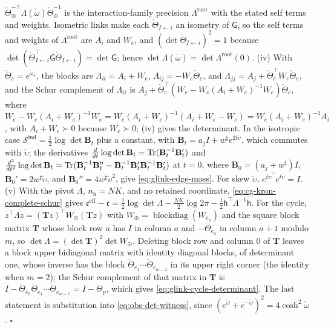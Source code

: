 \(\mathring\Theta_\oplus^{-\top}\Lambda(\mathring\omega)\mathring\Theta_\oplus^{-1}\) is the interaction-family precision
\(\Lambda^{\mathrm{root}}\) with the stated self terms and weights. Isometric links make each
\(\mathring\Theta_{I\leftarrow i}\) an isometry of \(\mathsf G\), so the self terms and weights of \(\Lambda^{\mathrm{root}}\)
are \(A_i\) and \(W_e\), and \((\det\mathring\Theta_{I\leftarrow i})^2=1\) because
\(\det(\mathring\Theta_{I\leftarrow i}^\top\mathsf G\mathring\Theta_{I\leftarrow i})=\det\mathsf G\); hence
\(\det\Lambda(\mathring\omega)=\det\Lambda^{\mathrm{root}}(0)\).
(iv) With \(\mathring\Theta_e=e^{\mathring\omega_e}\), the blocks are \(\Lambda_{ii}=A_i+W_e\),
\(\Lambda_{ij}=-W_e\mathring\Theta_e\), and \(\Lambda_{jj}=A_j+\mathring\Theta_e^\top W_e\mathring\Theta_e\), and the
Schur complement of \(\Lambda_{ii}\) is \(A_j+\mathring\Theta_e^\top(W_e-W_e(A_i+W_e)^{-1}W_e)\mathring\Theta_e\),
where \(W_e-W_e(A_i+W_e)^{-1}W_e=W_e(A_i+W_e)^{-1}(A_i+W_e-W_e)=W_e(A_i+W_e)^{-1}A_i\), with
\(A_i+W_e\succ0\) because \(W_e\succ0\); (iv) gives the determinant. In the
isotropic case \(\mathscr S^{\mathrm{ind}}=\tfrac12\log\det\mathbf B_t\) plus a constant, with \(\mathbf B_t=a_jI+w^\sharp e^{2t\mathring\upsilon}\), which commutes with \(\mathring\upsilon\); the
derivatives \(\frac{d}{dt}\log\det\mathbf B_t=\operatorname{Tr}(\mathbf B_t^{-1}\mathbf B_t')\) and
\(\frac{d^2}{dt^2}\log\det\mathbf B_t=\operatorname{Tr}(\mathbf B_t^{-1}\mathbf B_t''-\mathbf B_t^{-1}\mathbf B_t'\mathbf B_t^{-1}\mathbf B_t')\) at
\(t=0\), where \(\mathbf B_0=(a_j+w^\sharp)I\), \(\mathbf B_0'=2w^\sharp\mathring\upsilon\), and
\(\mathbf B_0''=4w^\sharp\mathring\upsilon^2\), give \eqref{eq:glink-edge-mass}. For skew \(\mathring\upsilon\),
\(e^{t\mathring\upsilon^\top}e^{t\mathring\upsilon}=I\).
(v) With the pivot \(\Lambda\), \(n_{\mathrm h}=NK\), and no retained coordinate,
\eqref{eq:cg-kron-complete-schur} gives
\(\mathfrak c^{\mathrm{eff}}-\mathfrak c=\tfrac12\log\det\Lambda-\tfrac{NK}2\log2\pi-\tfrac12\mathsf h^\top\Lambda^{-1}\mathsf h\).
For the cycle, \(z^\top\Lambda z=(\mathbf Tz)^\top W_\oplus(\mathbf Tz)\) with
\(W_\oplus=\operatorname{blockdiag}(W_{e_a})\) and the square block matrix \(\mathbf T\) whose block row \(a\)
has \(I\) in column \(a\) and \(-\mathring\Theta_{e_a}\) in column \(a+1\) modulo \(m\), so
\(\det\Lambda=(\det\mathbf T)^2\det W_\oplus\). Deleting block row and column \(0\) of \(\mathbf T\) leaves a
block upper bidiagonal matrix with identity diagonal blocks, of determinant one, whose inverse has the
block \(\mathring\Theta_{e_1}\cdots\mathring\Theta_{e_{m-2}}\) in its upper right corner (the identity when
\(m=2\)); the Schur complement of that matrix in \(\mathbf T\) is
\(I-\mathring\Theta_{e_0}\mathring\Theta_{e_1}\cdots\mathring\Theta_{e_{m-1}}=I-\mathring\Theta_p\), which gives
\eqref{eq:glink-cycle-determinant}. The last statement is substitution into \eqref{eq:obs-det-witness},
since \((e^{\mathring\omega}+e^{-\mathring\omega})^2=4\cosh^2\mathring\omega\). \hfill$\square$

